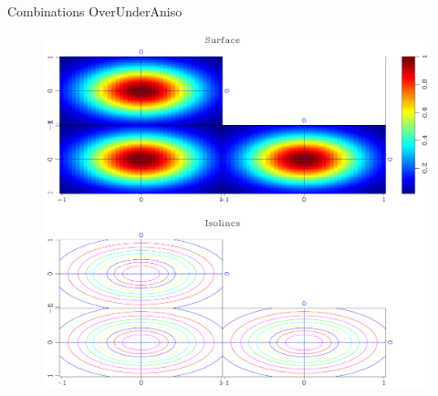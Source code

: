 \begin{frame}
  \begin{block}{Combinations}
    OverUnderAniso \\

     \begin{figure}
     \includegraphics[scale=0.25]{plot/Fig/ganom-3.pdf}
     \end{figure}

  \end{block}
\end{frame}
    

